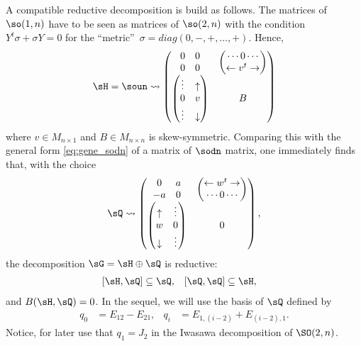 A compatible reductive decomposition is build as follows. The matrices of $\so(1,n)$ have to be seen as matrices of $\so(2,n)$ with the condition $Y^t\sigma+\sigma Y=0$ for the  ``metric''\ $\sigma=diag(0,-,+,\ldots,+)$. Hence,
\begin{equation}		\label{eq:gene_H}
	\sH=\soun\leadsto
	\begin{pmatrix}
		\begin{matrix}
			0 & 0 \\
			0 & 0
		\end{matrix}
		                       & \begin{pmatrix}
			                         \cdots 0\cdots \\
			                         \leftarrow v^t\rightarrow
		                         \end{pmatrix} \\
		\begin{pmatrix}
			\vdots & \uparrow   \\
			0      & v          \\
			\vdots & \downarrow
		\end{pmatrix} & B
	\end{pmatrix}
\end{equation}
where  $v\in M_{n\times 1}$ and $B\in M_{n\times n}$ is skew-symmetric. Comparing this with the general form \eqref{eq:gene_sodn} of a matrix of $\sodn$ matrix, one immediately finds that, with the choice
\begin{equation}\label{EqGeneRedQ}
	\sQ\leadsto
	\begin{pmatrix}
		\begin{matrix}
			0  & a \\
			-a & 0
		\end{matrix}
		                       & \begin{pmatrix}
			                         \leftarrow w^t\rightarrow \\
			                         \cdots 0\cdots            \\
		                         \end{pmatrix} \\
		\begin{pmatrix}
			\uparrow   & \vdots \\
			w          & 0      \\
			\downarrow & \vdots
		\end{pmatrix} & 0
	\end{pmatrix},
\end{equation}
the decomposition $\sG=\sH\oplus\sQ$ is reductive:
\begin{align}		\label{EqDefRedHQ}
	[\sH,\sQ] & \subseteq\sQ,
	          & [\sQ,\sQ]     & \subseteq\sH,
\end{align}
and $B(\sH,\sQ)=0$. In the sequel, we will use the basis of $\sQ$ defined by
\begin{align}		\label{EqDefBaseqi}
	q_0 & =E_{12}-E_{21}, & q_i & =E_{1,(i-2)}+E_{(i-2),1}.
\end{align}
Notice, for later use that $q_1=J_2$ in the Iwasawa decomposition of $\SO(2,n)$.

